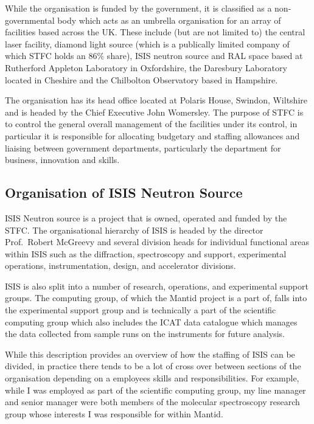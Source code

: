 \documentclass[paper=a4, fontsize=11pt]{scrartcl}	%
\numberwithin{equation}{section}															%
\numberwithin{figure}{section}																%
\numberwithin{table}{section}
\begin{document}
While the organisation is funded by the government, it is classified as
a non-governmental body which acts as an umbrella organisation for an
array of facilities based across the UK. These include (but are not
limited to) the central laser facility, diamond light source (which is a
publically limited company of which STFC holds an 86\% share), ISIS
neutron source and RAL space based at Rutherford Appleton Laboratory in
Oxfordshire, the Daresbury Laboratory located in Cheshire and the
Chilbolton Observatory based in Hampshire.

The organisation has its head office located at Polaris House, Swindon,
Wiltshire and is headed by the Chief Executive John Womersley. The
purpose of STFC is to control the general overall management of the
facilities under its control, in particular it is responsible for
allocating budgetary and staffing allowances and liaising between
government departments, particularly the department for business,
innovation and skills.

\subsection{Organisation of ISIS Neutron
Source}\label{organisation-of-isis-neutron-source}

ISIS Neutron source is a project that is owned, operated and funded by
the STFC. The organisational hierarchy of ISIS is headed by the director
Prof.~Robert McGreevy and several division heads for individual
functional areas within ISIS such as the diffraction, spectroscopy and
support, experimental operations, instrumentation, design, and
accelerator divisions.

ISIS is also split into a number of research, operations, and
experimental support groups. The computing group, of which the Mantid
project is a part of, falls into the experimental support group and is
technically a part of the scientific computing group which also includes
the ICAT data catalogue which manages the data collected from sample
runs on the instruments for future analysis.

While this description provides an overview of how the staffing of ISIS
can be divided, in practice there tends to be a lot of cross over
between sections of the organisation depending on a employees skills and
responsibilities. For example, while I was employed as part of the
scientific computing group, my line manager and senior manager were both
members of the molecular spectroscopy research group whose interests I
was responsible for within Mantid.
\end{document}
